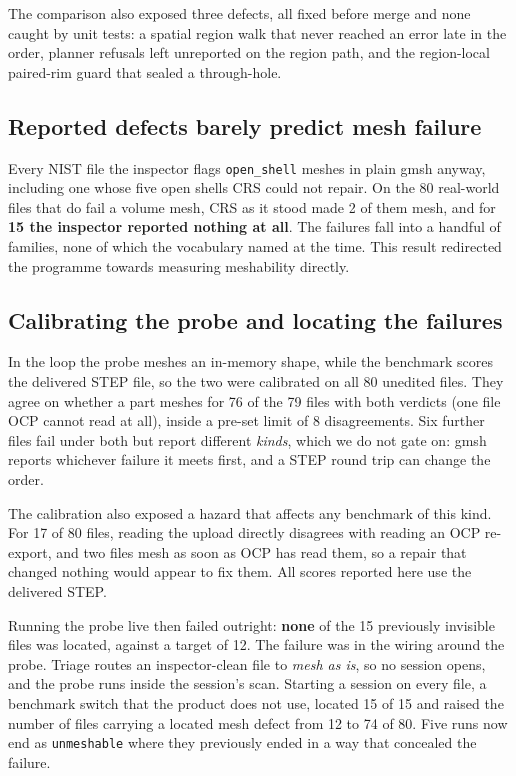 \documentclass[10pt,onecolumn]{article}
\newcommand{\code}[1]{\texttt{\small #1}}
\begin{document}
The comparison also exposed three defects, all fixed before merge and none caught by unit tests: a
spatial region walk that never reached an error late in the order, planner refusals left unreported
on the region path, and the region-local paired-rim guard that sealed a through-hole.

\subsection{Reported defects barely predict mesh failure}\label{sec:predict}

Every NIST file the inspector flags \code{open\_shell} meshes in plain gmsh anyway, including one
whose five open shells CRS could not repair. On the 80 real-world files that do fail a volume mesh,
CRS as it stood made 2 of them mesh, and for \textbf{15 the inspector reported nothing at all}. The
failures fall into a handful of families, none of which the vocabulary named at the time. This
result redirected the programme towards measuring meshability directly.

\subsection{Calibrating the probe and locating the failures}\label{sec:locate}

In the loop the probe meshes an in-memory shape, while the benchmark scores the delivered STEP file,
so the two were calibrated on all 80 unedited files. They agree on whether a part meshes for 76 of
the 79 files with both verdicts (one file OCP cannot read at all), inside a pre-set limit of 8
disagreements. Six further files fail under both but report different \emph{kinds}, which we do not
gate on: gmsh reports whichever failure it meets first, and a STEP round trip can change the order.

The calibration also exposed a hazard that affects any benchmark of this kind. For 17 of 80 files,
reading the upload directly disagrees with reading an OCP re-export, and two files mesh as soon as
OCP has read them, so a repair that changed nothing would appear to fix them. All scores reported
here use the delivered STEP.

Running the probe live then failed outright: \textbf{none} of the 15 previously invisible files was
located, against a target of 12. The failure was in the wiring around the probe. Triage routes an inspector-clean file to \emph{mesh as is}, so no session opens, and the
probe runs inside the session's scan. Starting a session on every file, a benchmark switch that the
product does not use, located 15 of 15 and raised the number of files carrying a located mesh defect
from 12 to
74 of 80. Five runs now end as \code{unmeshable} where they previously ended in a way that concealed
the failure.
\end{document}

